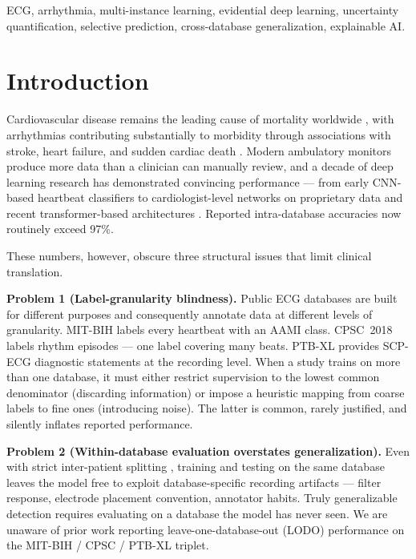 \documentclass[conference]{IEEEtran}
\begin{document}
\begin{IEEEkeywords}
ECG, arrhythmia, multi-instance learning, evidential deep learning, uncertainty quantification, selective prediction, cross-database generalization, explainable AI.
\end{IEEEkeywords}

\section{Introduction}

Cardiovascular disease remains the leading cause of mortality worldwide \cite{who2021}, with arrhythmias contributing substantially to morbidity through associations with stroke, heart failure, and sudden cardiac death \cite{hong2020}. Modern ambulatory monitors produce more data than a clinician can manually review, and a decade of deep learning research has demonstrated convincing performance --- from early CNN-based heartbeat classifiers \cite{acharya2017} to cardiologist-level networks on proprietary data \cite{hannun2019} and recent transformer-based architectures \cite{ecgformer2024,ecgtransform2024}. Reported intra-database accuracies now routinely exceed 97\%.

These numbers, however, obscure three structural issues that limit clinical translation.

\textbf{Problem 1 (Label-granularity blindness).} Public ECG databases are built for different purposes and consequently annotate data at different levels of granularity. MIT-BIH \cite{mitbih2001} labels every heartbeat with an AAMI class. CPSC~2018 \cite{cpsc2018} labels rhythm episodes --- one label covering many beats. PTB-XL \cite{ptbxl2020} provides SCP-ECG diagnostic statements at the recording level. When a study trains on more than one database, it must either restrict supervision to the lowest common denominator (discarding information) or impose a heuristic mapping from coarse labels to fine ones (introducing noise). The latter is common, rarely justified, and silently inflates reported performance.

\textbf{Problem 2 (Within-database evaluation overstates generalization).} Even with strict inter-patient splitting \cite{dechazal2004}, training and testing on the same database leaves the model free to exploit database-specific recording artifacts --- filter response, electrode placement convention, annotator habits. Truly generalizable detection requires evaluating on a database the model has never seen. We are unaware of prior work reporting leave-one-database-out (LODO) performance on the MIT-BIH / CPSC / PTB-XL triplet.
\end{document}
